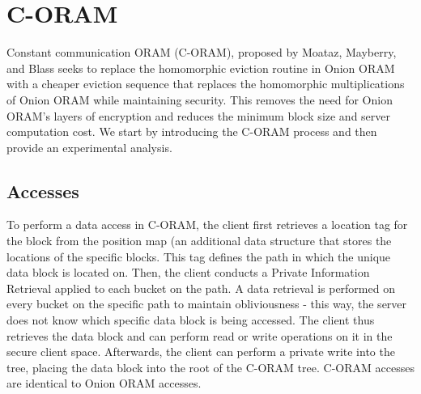 \documentclass[12pt, oneside]{article}   	%
\begin{document}
\section{C-ORAM}
Constant communication ORAM (C-ORAM), proposed by Moataz, Mayberry, and Blass seeks to replace the homomorphic eviction routine in Onion ORAM with a cheaper eviction sequence that replaces the homomorphic multiplications of Onion ORAM while maintaining security. This removes the need for Onion ORAM's layers of encryption and reduces the minimum block size and server computation cost. We start by introducing the C-ORAM process and then provide an experimental analysis.

\subsection{Accesses}

To perform a data access in C-ORAM, the client first retrieves a location tag for the block from the position map (an additional data structure that stores the locations of the specific blocks. This tag defines the path in which the unique data block is located on. Then, the client conducts a Private Information Retrieval applied to each bucket on the path. A data retrieval is performed on every bucket on the specific path to maintain obliviousness - this way, the server does not know which specific data block is being accessed. The client thus retrieves the data block and can perform read or write operations on it in the secure client space. Afterwards, the client can perform a private write into the tree, placing the data block into the root of the C-ORAM tree. C-ORAM accesses are identical to Onion ORAM accesses.
\end{document}
